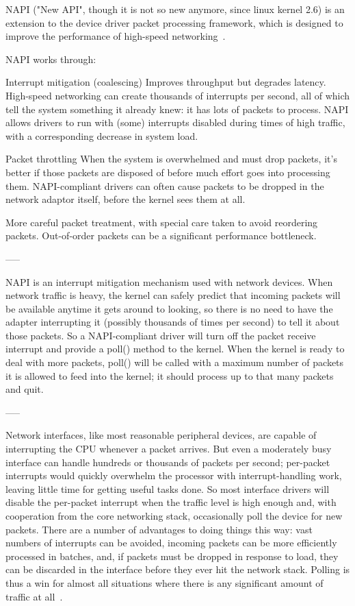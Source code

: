 NAPI ("New API", though it is not so new anymore, since linux kernel 2.6) is an extension to the device driver packet processing framework, which is designed to improve the performance of high-speed networking~\cite{linux-foundation-napi}.

NAPI works through:

Interrupt mitigation (coalescing)
 Improves throughput but degrades latency.
    High-speed networking can create thousands of interrupts per second, all of which tell the system something it already knew: it has lots of packets to process. NAPI allows drivers to run with (some) interrupts disabled during times of high traffic, with a corresponding decrease in system load.

Packet throttling 
    When the system is overwhelmed and must drop packets, it's better if those packets are disposed of before much effort goes into processing them. NAPI-compliant drivers can often cause packets to be dropped in the network adaptor itself, before the kernel sees them at all.

More careful packet treatment, with special care taken to avoid reordering packets. Out-of-order packets can be a significant performance bottleneck. 


-----


NAPI is an interrupt mitigation mechanism used with network devices. When network traffic is heavy,
the kernel can safely predict that incoming packets will be available anytime it gets around to looking,
so there is no need to have the adapter interrupting it (possibly thousands of times per second)
to tell it about those packets. So a NAPI-compliant driver will turn off the packet receive interrupt
and provide a poll() method to the kernel.
When the kernel is ready to deal with more packets, poll() will be called with a maximum number
of packets it is allowed to feed into the kernel; it should process up to that many packets and quit.

-----

Network interfaces, like most reasonable peripheral devices,
are capable of interrupting the CPU whenever a packet arrives.
But even a moderately busy interface can handle hundreds or thousands of packets per second;
per-packet interrupts would quickly overwhelm the processor with interrupt-handling work,
leaving little time for getting useful tasks done. So most interface drivers will disable the per-packet
interrupt when the traffic level is high enough and, with cooperation from the core networking stack,
occasionally poll the device for new packets. There are a number of advantages to doing things this way:
vast numbers of interrupts can be avoided, incoming packets can be more efficiently processed in batches,
and, if packets must be dropped in response to load, they can be discarded in
the interface before they ever hit the network stack. Polling is thus a win for
almost all situations where there is any significant amount of traffic at all~\cite{low-latency-ethernet-device-polling}.

